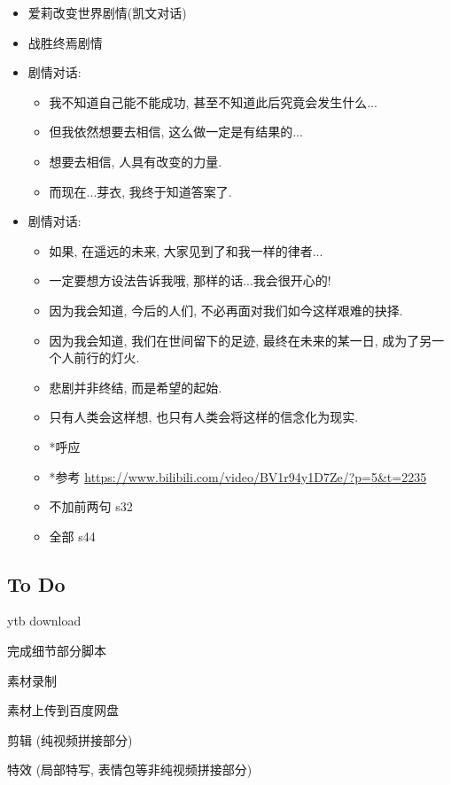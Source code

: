 \documentclass[a4paper]{article}
\begin{document}
\begin{itemize}
    \item 爱莉改变世界剧情(凯文对话)
    \item 战胜终焉剧情
    \item 剧情对话:
    \begin{itemize}
        \item 我不知道自己能不能成功, 甚至不知道此后究竟会发生什么...
        \item 但我依然想要去相信, 这么做一定是有结果的...
        \item 想要去相信, 人具有改变的力量.
        \item 而现在...芽衣, 我终于知道答案了.
    \end{itemize}
    \item 剧情对话:
    \begin{itemize}
        \item 如果, 在遥远的未来, 大家见到了和我一样的律者...
        \item 一定要想方设法告诉我哦, 那样的话...我会很开心的!
        \item 因为我会知道, 今后的人们, 不必再面对我们如今这样艰难的抉择.
        \item 因为我会知道, 我们在世间留下的足迹, 最终在未来的某一日, 成为了另一个人前行的灯火.
        \item 悲剧并非终结, 而是希望的起始.
        \item 只有人类会这样想, 也只有人类会将这样的信念化为现实.
        \item *呼应
        \item *参考 \url{https://www.bilibili.com/video/BV1r94y1D7Ze/?p=5&t=2235}
        \item 不加前两句 s32
        \item 全部 s44
    \end{itemize}
\end{itemize}

\subsection{To Do}

ytb download

完成细节部分脚本

素材录制

素材上传到百度网盘

剪辑 (纯视频拼接部分)

特效 (局部特写, 表情包等非纯视频拼接部分)
\end{document}
